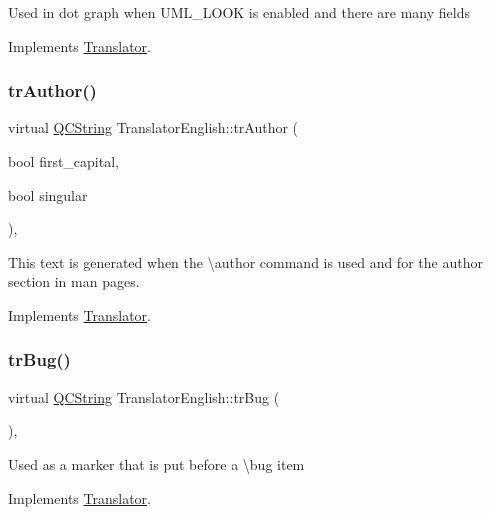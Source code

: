 Used in dot graph when U\+M\+L\+\_\+\+L\+O\+OK is enabled and there are many fields 

Implements \mbox{\hyperlink{class_translator}{Translator}}.

\mbox{\label{class_translator_english_ade7d4af714a08ff6fe6bdf3d98983c0b}} 
\subsubsection{\texorpdfstring{trAuthor()}{trAuthor()}}
{\footnotesize\ttfamily virtual \mbox{\hyperlink{class_q_c_string}{Q\+C\+String}} Translator\+English\+::tr\+Author (\begin{DoxyParamCaption}\item[{bool}]{first\+\_\+capital,  }\item[{bool}]{singular }\end{DoxyParamCaption})\hspace{0.3cm}{\ttfamily [inline]}, {\ttfamily [virtual]}}

This text is generated when the \textbackslash{}author command is used and for the author section in man pages. 

Implements \mbox{\hyperlink{class_translator}{Translator}}.

\mbox{\label{class_translator_english_a2dd8a34d6c6b85c492f6ff381fbc1990}} 
\subsubsection{\texorpdfstring{trBug()}{trBug()}}
{\footnotesize\ttfamily virtual \mbox{\hyperlink{class_q_c_string}{Q\+C\+String}} Translator\+English\+::tr\+Bug (\begin{DoxyParamCaption}{ }\end{DoxyParamCaption})\hspace{0.3cm}{\ttfamily [inline]}, {\ttfamily [virtual]}}

Used as a marker that is put before a \textbackslash{}bug item 

Implements \mbox{\hyperlink{class_translator}{Translator}}.

\mbox{\label{class_translator_english_ae1fcdbfe8485cc1da19d664b28b5aca6}} 
